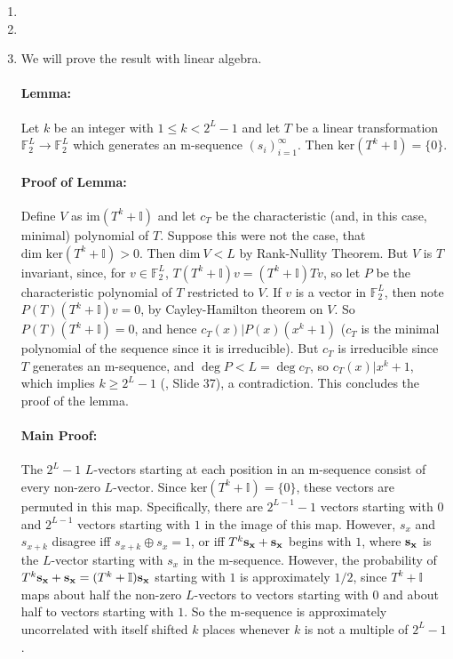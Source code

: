\begin{enumerate}
\item
\item
\item We will prove the result with linear algebra.

\paragraph{Lemma:} Let $k$ be an integer with $1 \le k < 2^L-1$ and let $T$
be a linear transformation $\mathbb{F}^L_2 \to \mathbb{F}^L_2$ which
generates an m-sequence $(s_i)_{i=1}^\infty$. Then $\text{ker}(T^k+\mathbb{I})=\{0\}$.

\paragraph{Proof of Lemma:} Define $V$ as $\text{im}(T^k+\mathbb{I})$ and let
$c_T$ be the characteristic (and, in this case, minimal) polynomial of $T$.
Suppose this were not the case, that
$\text{dim ker}(T^k+\mathbb{I})>0$. Then $\text{dim}\ V<L$ by Rank-Nullity Theorem.
But $V$ is $T$ invariant, since, for $v \in \mathbb{F}_2^L$,
$T(T^k+\mathbb{I})v=(T^k+\mathbb{I})Tv$,
so let $P$ be the characteristic polynomial of $T$ restricted to $V$.
If $v$ is a vector in $\mathbb{F}^L_2$, then note $P(T)(T^k+\mathbb{I})v=0$,
by Cayley-Hamilton theorem on $V$. So $P(T)(T^k+\mathbb{I})=0$, and hence
$c_T(x) | P(x)(x^k+1)$ ($c_T$ is the minimal polynomial of the sequence
since it is irreducible). But $c_T$ is irreducible since $T$ generates an
m-sequence, and $\deg P<L=\deg c_T$, so $c_T(x) | x^k+1$, which implies
$k\ge 2^L-1$ (\cite{slides}, Slide 37), a contradiction. This concludes
the proof of the lemma.

\paragraph{Main Proof:} The $2^L-1$ $L$-vectors starting at each position
in an m-sequence consist of every non-zero $L$-vector. Since 
$\text{ker}(T^k+\mathbb{I})=\{0\}$, these vectors are permuted in this map.
Specifically, there are $2^{L-1}-1$ vectors starting with $0$ and $2^{L-1}$ vectors
starting with $1$ in the image of this map. However, $s_x$ and $s_{x+k}$
disagree iff $s_{x+k}\oplus s_x=1$, or iff $T^k{\bf s_x}+{\bf s_x}$ begins with
$1$, where ${\bf s_x}$ is the $L$-vector starting with $s_x$ in the m-sequence.
However, the probability of $T^k{\bf s_x}+{\bf s_x}=(T^k+\mathbb{I}){\bf s_x}$
starting with $1$ is approximately $1/2$, since $T^k+\mathbb{I}$ maps about half the non-zero
$L$-vectors to vectors starting with $0$ and about half to vectors starting with
$1$. So the m-sequence
is approximately uncorrelated with itself shifted $k$ places whenever $k$ is not
a multiple of $2^L-1$.
\end{enumerate}
